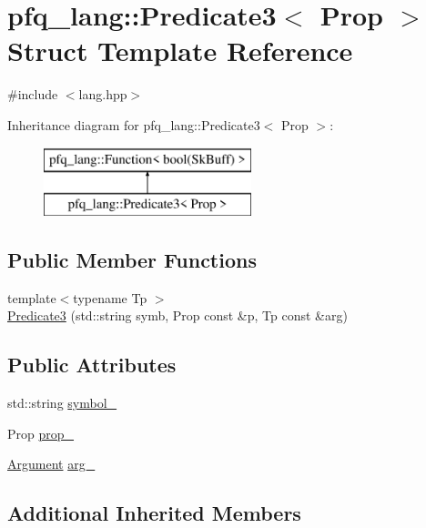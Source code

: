 \hypertarget{structpfq__lang_1_1Predicate3}{\section{pfq\+\_\+lang\+:\+:Predicate3$<$ Prop $>$ Struct Template Reference}
\label{structpfq__lang_1_1Predicate3}
}


{\ttfamily \#include $<$lang.\+hpp$>$}

Inheritance diagram for pfq\+\_\+lang\+:\+:Predicate3$<$ Prop $>$\+:\begin{figure}[H]
\begin{center}
\leavevmode
\includegraphics[height=2.000000cm]{structpfq__lang_1_1Predicate3}
\end{center}
\end{figure}
\subsection*{Public Member Functions}
\begin{DoxyCompactItemize}
\item 
{\footnotesize template$<$typename Tp $>$ }\\\hyperlink{structpfq__lang_1_1Predicate3_a1b2f41a793ac559592df47896b2a1180}{Predicate3} (std\+::string symb, Prop const \&p, Tp const \&arg)
\end{DoxyCompactItemize}
\subsection*{Public Attributes}
\begin{DoxyCompactItemize}
\item 
std\+::string \hyperlink{structpfq__lang_1_1Predicate3_acd29e8718600ed723e659fa19251a6f5}{symbol\+\_\+}
\item 
Prop \hyperlink{structpfq__lang_1_1Predicate3_a3d1b5001e401ee228375eefc72da5d88}{prop\+\_\+}
\item 
\hyperlink{structpfq__lang_1_1Argument}{Argument} \hyperlink{structpfq__lang_1_1Predicate3_adf52e42c7be28e2cb25d2f188e501f48}{arg\+\_\+}
\end{DoxyCompactItemize}
\subsection*{Additional Inherited Members}


